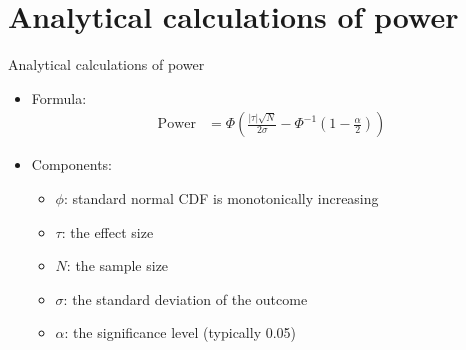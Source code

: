\documentclass[
  ignorenonframetext,
]{beamer}
\providecommand{\tightlist}{%
  \setlength{\itemsep}{0pt}\setlength{\parskip}{0pt}}
\begin{document}
\hypertarget{analytical-calculations-of-power}{%
\section{Analytical calculations of
power}\label{analytical-calculations-of-power}}

\begin{frame}{Analytical calculations of power}
\protect\hypertarget{analytical-calculations-of-power-1}{}
\begin{itemize}
\item
  Formula: \begin{align*}
  \text{Power} &= \Phi\left(\frac{|\tau| \sqrt{N}}{2\sigma}- \Phi^{-1}(1- \frac{\alpha}{2})\right)
  \end{align*}
\item
  Components:

  \begin{itemize}
  \tightlist
  \item
    \(\phi\): standard normal CDF is monotonically increasing
  \item
    \(\tau\): the effect size
  \item
    \(N\): the sample size
  \item
    \(\sigma\): the standard deviation of the outcome
  \item
    \(\alpha\): the significance level (typically 0.05)
  \end{itemize}
\end{itemize}
\end{frame}
\end{document}
